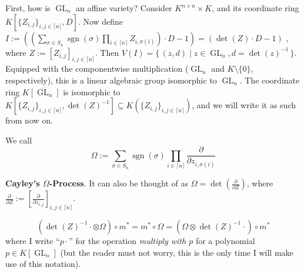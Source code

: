 First, how is $\operatorname{GL}_n$ an affine variety?
Consider $ K^{n \times n} \times K $, and its coordinate ring $ K\left\lbrack \lbrace Z_{i,j} \rbrace_{i,j \in \lceil n \rceil} , D \right\rbrack$.
Now define $ I := \left( \left( \sum_{\sigma \in S_n} \operatorname{sgn} \left( \sigma \right) \prod_{ i \in \lceil n \rceil } Z_{i, \sigma \left( i \right) } \right) \cdot D - 1 \right)  = \left( \operatorname{det} \left( Z \right) \cdot D - 1 \right) $ , where $ Z := \left\lbrack Z_{i,j} \right\rbrack_{i,j \in \lceil n \rceil} $.
Then $ V \left( I \right) = \lbrace \, \left( z , d \right) \mid z \in \operatorname{GL}_n , d = \operatorname{det} \left( z \right)^{-1} \, \rbrace $.
Equipped with the componentwise multiplication ($\operatorname{GL}_n$ and $K \setminus \lbrace 0 \rbrace$, respectively), this is a linear algebraic group isomorphic to $\operatorname{GL}_n$.
The coordinate ring $K\left\lbrack \operatorname{GL}_n\right\rbrack$ is isomorphic to $K \left\lbrack \lbrace Z_{i,j} \rbrace_{i,j \in \lceil n \rceil} , \operatorname{det} \left( Z \right)^{-1} \right\rbrack \subseteq K \left( \lbrace Z_{i,j} \rbrace_{i,j \in \lceil n \rceil} \right) $, and we will write it as such from now on.
\begin{definition}
  We call
  \begin{equation}
    \Omega := \sum_{\sigma \in S_n} \operatorname{sgn} \left( \sigma \right) \prod_{ i \in \lceil n \rceil } \frac{\partial}{\partial z_{i , \sigma \left( i \right)}}
  \end{equation}
\end{definition}
\textbf{Cayley's $\Omega$-Process}.
It can also be thought of as $ \Omega = \operatorname{det} \left( \frac{\partial}{\partial Z} \right) $, where $\frac{\partial}{\partial Z} := \left\lbrack \frac{\partial}{\partial z_{i,j}} \right\rbrack_{i,j \in \lceil n \rceil} $.

\begin{lemma}
  \begin{equation}
    \left( \operatorname{det} \left( Z \right) ^{-1} \cdot \otimes \Omega \right) \circ m^\ast
    = m^\ast \circ \Omega
    = \left( \Omega \otimes \operatorname{det} \left( Z \right) ^{-1} \cdot \right) \circ m^\ast
  \end{equation}
  where I write ``$ p \cdot $'' for the operation \textit{multiply with $ p $} for a polynomial $ p \in K \left\lbrack \operatorname{GL}_n \right\rbrack $ (but the reader must not worry, this is the only time I will make use of this notation).
\end{lemma}


